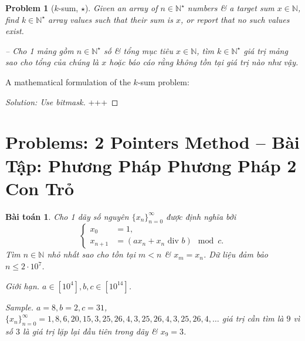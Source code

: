 \documentclass{article}
\newtheorem{baitoan}{Bài toán}
\newtheorem{problem}{Problem}
\begin{document}
\begin{problem}[$k$-sum, $\star$]
    Given an array of $n\in\mathbb{N}^\star$ numbers \& a target sum $x\in\mathbb{N}$, find $k\in\mathbb{N}^\star$ array values such that their sum is $x$, or report that no such values exist.

    -- Cho 1 mảng gồm $n\in\mathbb{N}^\star$ số \& tổng mục tiêu $x\in\mathbb{N}$, tìm $k\in\mathbb{N}^\star$ giá trị mảng sao cho tổng của chúng là $x$ hoặc báo cáo rằng không tồn tại giá trị nào như vậy.
\end{problem}
A mathematical formulation of the $k$-sum problem:
\begin{center}
\end{center}

\begin{proof}[Solution: Use bitmask]
    +++
\end{proof}


\section{Problems: 2 Pointers Method -- Bài Tập: Phương Pháp Phương Pháp 2 Con Trỏ}

\begin{baitoan}
     Cho 1 dãy số nguyên $\{x_n\}_{n=0}^\infty$ được định nghĩa bởi
     \begin{equation*}
         \left\{\begin{split}
             x_0 &= 1,\\
             x_{n+1} &= (ax_n + x_n\mbox{ div } b)\mod c.
         \end{split}\right.
     \end{equation*}
     Tìm $n\in\mathbb{N}$ nhỏ nhất sao cho tồn tại $m < n$ \& $x_m = x_n$. Dữ liệu đảm bảo $n\le2\cdot10^7$.
     \item {\sf Giới hạn.} $a\in[10^4],b,c\in[10^{14}]$.
     \item {\sf Sample.} $a = 8,b = 2,c = 31$, $\{x_n\}_{n=0}^\infty = 1,8,6,20,15,3,25,26,4,3,25,26,4,3,25,26,4,\ldots$ giá trị cần tìm là $9$ vì số $3$ là giá trị lặp lại đầu tiên trong dãy \& $x_9 = 3$.
\end{baitoan}
\end{document}
